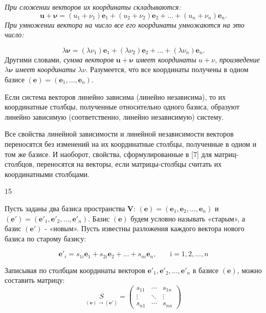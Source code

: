 \documentclass[10pt]{book}
\begin{document}
{    \textit{При сложении векторов их координаты складываются:}$$\mathbf{u}+\mathbf{\nu}=(u_{1}+\nu_{1})\mathbf{e}_1+(u_{2}+\nu_{2})\mathbf{e}_2+\dotsc+(u_{n}+\nu_{n})\mathbf{e}_n\text{.}$$
    \textit{При умножении вектора на число все его координаты умножаются на это число:}\par$$\lambda\mathbf{\nu}=(\lambda\nu_{1})\mathbf{e}_1+(\lambda\nu_{2})\mathbf{e}_2+\dotsc+(\lambda\nu_{n})\mathbf{e}_n\text{.}$$
    Другими словами, \textit{сумма векторов} $\mathbf{u}+\mathbf{\nu}$ \textit{имеет координаты} $u+\nu$, \textit{произведение} $\lambda\mathbf{\nu}$ \textit{имеет координаты} $\lambda\nu$. Разумеется, что все координаты получены в одном базисе $(\mathbf{e})=(\mathbf{e}_1,\dotsc,\mathbf{e}_n)$.\par
    Если система векторов линейно зависима (линейно независима), то их координатные
    столбцы, полученные относительно одного базиса, образуют линейно зависимую (соответственно, линейно независимую) систему.\par
    Все свойства линейной зависимости и линейной независимости векторов переносятся
    без изменений на их координатные столбцы, полученные в одном и том же базисе. И наоборот, свойства, сформулированные в [7] для матриц-столбцов, переносятся на векторы, если
    матрицы-столбцы считать их координатными столбцами.\vfill
    \begin{center}
        15
    \end{center}
    \pagebreak

    Пусть заданы два базиса пространства $\mathbf{V}\text{: }(\mathbf{e})=(\mathbf{e}_{1},\mathbf{e}_{2},\dotsc,\mathbf{e}_{n})$ и $(\mathbf{e'})=(\mathbf{e'}_{1},\mathbf{e'}_{2},\dotsc,\mathbf{e'}_{n})$. Базис $(\mathbf{e})$ будем условно называть «старым», а базис $(\mathbf{e'})$ - «новым».  Пусть известны разложения
    каждого вектора нового базиса по старому базису:\par
    $$\mathbf{e'}_i=s_{1i}\mathbf{e}_1+s_{2i}\mathbf{e}_2+\dotsc+s_{ni}\mathbf{e}_n\text{,}\qquad\text{i}=1,2,\dotsc,n$$

    Записывая по столбцам координаты векторов $\mathbf{e'}_1,\mathbf{e'}_2,\dotsc,\mathbf{e'}_n$ в базисе $\mathbf{(e)}$, можно составить матрицу:$$\underset{\mathbf{(e)\rightarrow(e')}}{S}=
    \begin{pmatrix}
        s_{11} & \cdots & s_{1n} \\
        \vdots & \ddots & \vdots \\
        s_{n1} & \cdots & s_{nn}
    \end{pmatrix}$$

}
\end{document}
